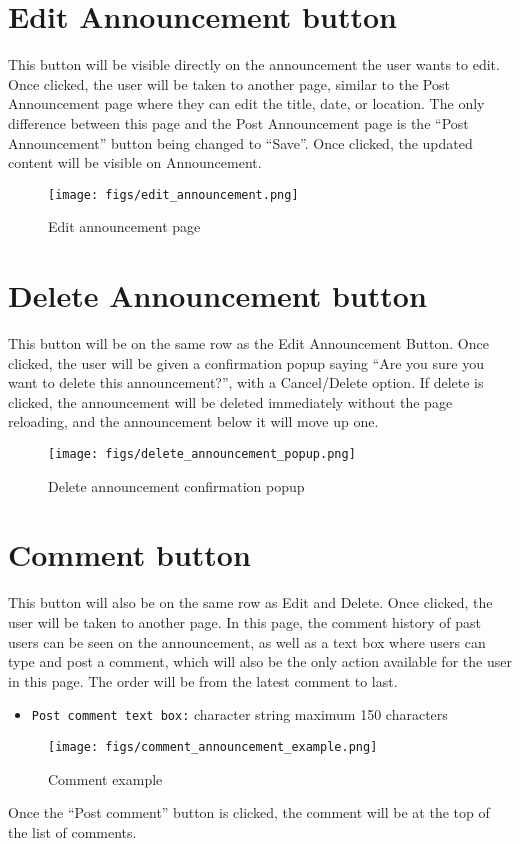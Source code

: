 \documentclass[conference]{IEEEtran}
\begin{document}
\section*{Edit Announcement button}
This button will be visible directly on the announcement the user wants to edit. Once clicked, the user will be taken to another page, similar to the Post Announcement page where they can edit the title, date, or location. The only difference between this page and the Post Announcement page is the “Post Announcement” button being changed to “Save”. Once clicked, the updated content will be visible on Announcement.
\begin{figure}[H]
\centering
\texttt{[image: figs/edit\_announcement.png]}
\caption{Edit announcement page}
\label{fig:Edit announcement page}
\end{figure}
\section*{Delete Announcement button}
This button will be on the same row as the Edit Announcement Button. Once clicked, the user will be given a confirmation popup saying “Are you sure you want to delete this announcement?”, with a Cancel/Delete option. If delete is clicked,  the announcement will be deleted immediately without the page reloading, and the announcement below it will move up one.
\begin{figure}[H]
\centering
\texttt{[image: figs/delete\_announcement\_popup.png]}
\caption{Delete announcement confirmation popup}
\label{fig:Delete announcement confirmation popup}
\end{figure}
\section*{Comment button}
This button will also be on the same row as Edit and Delete. Once clicked, the user will be taken to another page. In this page, the comment history of past users can be seen on the announcement, as well as a text box where users can type and post a comment, which will also be the only action available for the user in this page.  The order will be from the latest comment to last.
\begin{itemize}
    \item \texttt{Post comment text box:} character string maximum 150 characters
\end{itemize}
\begin{figure}[H]
\centering
\texttt{[image: figs/comment\_announcement\_example.png]}
\caption{Comment example}
\label{fig:Comment example}
\end{figure}
Once the “Post comment” button is clicked, the comment will be at the top of the list of comments.
\end{document}

